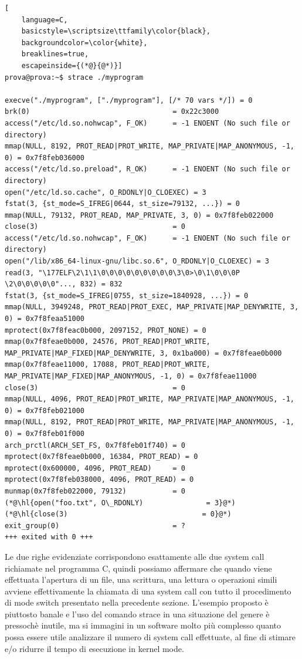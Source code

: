 \begin{lstlisting}[
  	language=C,
  	basicstyle=\scriptsize\ttfamily\color{black},
    backgroundcolor=\color{white},
    breaklines=true,
  	escapeinside={(*@}{@*)}]
prova@prova:~$ strace ./myprogram

execve("./myprogram", ["./myprogram"], [/* 70 vars */]) = 0
brk(0)                                  = 0x22c3000
access("/etc/ld.so.nohwcap", F_OK)      = -1 ENOENT (No such file or directory)
mmap(NULL, 8192, PROT_READ|PROT_WRITE, MAP_PRIVATE|MAP_ANONYMOUS, -1, 0) = 0x7f8feb036000
access("/etc/ld.so.preload", R_OK)      = -1 ENOENT (No such file or directory)
open("/etc/ld.so.cache", O_RDONLY|O_CLOEXEC) = 3
fstat(3, {st_mode=S_IFREG|0644, st_size=79132, ...}) = 0
mmap(NULL, 79132, PROT_READ, MAP_PRIVATE, 3, 0) = 0x7f8feb022000
close(3)                                = 0
access("/etc/ld.so.nohwcap", F_OK)      = -1 ENOENT (No such file or directory)
open("/lib/x86_64-linux-gnu/libc.so.6", O_RDONLY|O_CLOEXEC) = 3
read(3, "\177ELF\2\1\1\0\0\0\0\0\0\0\0\0\3\0>\0\1\0\0\0P \2\0\0\0\0\0"..., 832) = 832
fstat(3, {st_mode=S_IFREG|0755, st_size=1840928, ...}) = 0
mmap(NULL, 3949248, PROT_READ|PROT_EXEC, MAP_PRIVATE|MAP_DENYWRITE, 3, 0) = 0x7f8feaa51000
mprotect(0x7f8feac0b000, 2097152, PROT_NONE) = 0
mmap(0x7f8feae0b000, 24576, PROT_READ|PROT_WRITE, MAP_PRIVATE|MAP_FIXED|MAP_DENYWRITE, 3, 0x1ba000) = 0x7f8feae0b000
mmap(0x7f8feae11000, 17088, PROT_READ|PROT_WRITE, MAP_PRIVATE|MAP_FIXED|MAP_ANONYMOUS, -1, 0) = 0x7f8feae11000
close(3)                                = 0
mmap(NULL, 4096, PROT_READ|PROT_WRITE, MAP_PRIVATE|MAP_ANONYMOUS, -1, 0) = 0x7f8feb021000
mmap(NULL, 8192, PROT_READ|PROT_WRITE, MAP_PRIVATE|MAP_ANONYMOUS, -1, 0) = 0x7f8feb01f000
arch_prctl(ARCH_SET_FS, 0x7f8feb01f740) = 0
mprotect(0x7f8feae0b000, 16384, PROT_READ) = 0
mprotect(0x600000, 4096, PROT_READ)     = 0
mprotect(0x7f8feb038000, 4096, PROT_READ) = 0
munmap(0x7f8feb022000, 79132)           = 0
(*@\hl{open("foo.txt", O\_RDONLY)               = 3}@*)
(*@\hl{close(3)                                = 0}@*)
exit_group(0)                           = ?
+++ exited with 0 +++
\end{lstlisting}

Le due righe evidenziate corrispondono esattamente alle due system call richiamate nel programma C, quindi possiamo affermare che quando viene effettuata l'apertura di un file, una scrittura, una lettura o operazioni simili avviene effettivamente la chiamata di una system call con tutto il procedimento di mode switch presentato nella precedente sezione. L'esempio proposto è piuttosto banale e l'uso del comando strace in una situazione del genere è pressochè inutile, ma si immagini in un software molto più complesso quanto possa essere utile analizzare il numero di system call effettuate, al fine di stimare e/o ridurre il tempo di esecuzione in kernel mode.

